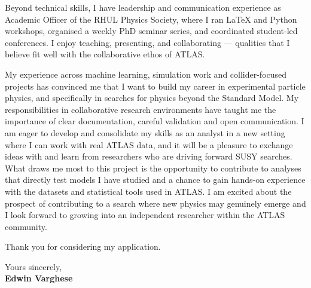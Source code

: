 \documentclass[11pt]{report}
\begin{document}
\begin{titlepage}
	Beyond technical skills, I have leadership and communication experience as Academic Officer of the RHUL Physics Society, where I ran LaTeX and Python workshops, organised a weekly PhD seminar series, and coordinated student-led conferences. I enjoy teaching, presenting, and collaborating --- qualities that I believe fit well with the collaborative ethos of ATLAS.\\
	\vspace{0.7em} 
	
	My experience across machine learning, simulation work and collider-focused projects has convinced me that I want to build my career in experimental particle physics, and specifically in searches for physics beyond the Standard Model. My responsibilities in collaborative research environments have taught me the importance of clear documentation, careful validation and open communication. I am eager to develop and consolidate my skills as an analyst in a new setting where I can work with real ATLAS data, and it will be a pleasure to exchange ideas with and learn from researchers who are driving forward SUSY searches. What draws me most to this project is the opportunity to contribute to analyses that directly test models I have studied and a chance to gain hands-on experience with the datasets and statistical tools used in ATLAS. I am excited about the prospect of contributing to a search where new physics may genuinely emerge and I look forward to growing into an independent researcher within the ATLAS community.\\
	\vspace{0.7em}
	
	
	Thank you for considering my application.\\
	\vspace{5em}
		
		\raggedright Yours sincerely,\\
		\vspace{0.7em}
		\textbf{Edwin Varghese}
		
	\end{titlepage}
\end{document}
